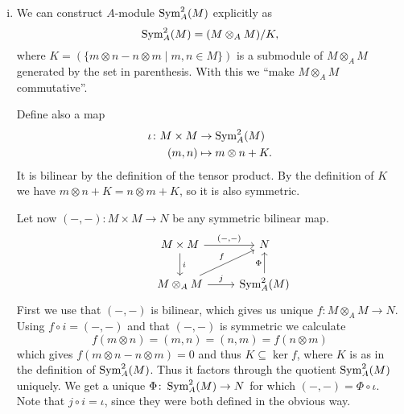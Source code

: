 \begin{exercise}{4}
    \begin{enumerate}[i)]
        \item We can construct $A$-module $\operatorname{Sym}^2_A(M)$ explicitly as
            \begin{equation*}
                \operatorname{Sym}^2_A(M) = (M \otimes_A M) / K,
            \end{equation*}
            where $K = (\{ m \otimes n - n \otimes m \mid m, n \in M \})$ is a
            submodule of $M \otimes_A M$ generated by the set in parenthesis. With
            this we ``make $M \otimes_A M$ commutative''.

            Define also a map
            \begin{align*}
                \iota \colon M \times M &\rightarrow \operatorname{Sym}^2_A(M) \\
                (m, n) &\mapsto m \otimes n + K.
            \end{align*}
            It is bilinear by the definition of the tensor product. By the
            definition of $K$ we have $m \otimes n + K = n \otimes m + K$, so it
            is also symmetric.

            Let now $(-, -) \colon M \times M \rightarrow N$ be any symmetric
            bilinear map.
            \[
                \begin{tikzcd}
                    &M \times M \arrow{d}{i} \arrow{r}{(-, -)} &N \\
                    &M \otimes_A M \arrow{r}{j} \arrow{ru}{f} &\Sym^2_A(M)
                    \arrow{u}{\Phi}
                \end{tikzcd}
            \]
            First we use that $(-, -)$ is bilinear, which gives us unique $f
            \colon M \otimes_A M \rightarrow N$. Using $f \circ i = (-, -)$ and
            that $(-, -)$ is symmetric we calculate
            \begin{equation*}
                f(m \otimes n) = (m, n) = (n, m) = f(n \otimes m)
            \end{equation*}
            which gives $f(m \otimes n - n \otimes m) = 0$ and thus $K \subseteq
            \ker f$, where $K$ is as in the definition of $\operatorname{Sym}^2_A(M)$. Thus it
            factors through the quotient $\operatorname{Sym}^2_A(M)$ uniquely. We get a unique
            $\Phi \colon \operatorname{Sym}^2_A(M) \rightarrow N$ for which $(-, -) = \Phi
            \circ \iota$. Note that $j \circ i = \iota$, since they were both
            defined in the obvious way.


\end{enumerate}
\end{exercise}
